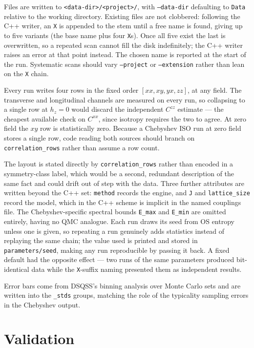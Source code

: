 \documentclass[11pt,a4paper]{article}
\newcommand{\code}[1]{\texttt{#1}}
\begin{document}
Files are written to \code{<data-dir>/<project>/}, with \code{--data-dir}
defaulting to \code{Data} relative to the working directory. Existing files are
not clobbered: following the C++ writer, an \code{X} is appended to the stem
until a free name is found, giving up to five variants (the base name plus four
\code{X}s). Once all five exist the last is overwritten, so a repeated scan
cannot fill the disk indefinitely; the C++ writer raises an error at that point
instead. The chosen name is reported at the start of the run. Systematic scans
should vary \code{--project} or \code{--extension} rather than lean on the
\code{X} chain.

Every run writes four rows in the fixed order $[xx,xy,yx,zz]$, at any field. The
transverse and longitudinal channels are measured on every run, so collapsing to
a single row at $h_z=0$ would discard the independent $C^{zz}$ estimate --- the
cheapest available check on $C^{xx}$, since isotropy requires the two to agree.
At zero field the $xy$ row is statistically zero. Because a Chebyshev ISO run at
zero field stores a single row, code reading both sources should branch on
\code{correlation\_rows} rather than assume a row count.

The layout is stated directly by \code{correlation\_rows} rather than encoded in
a symmetry-class label, which would be a second, redundant description of the
same fact and could drift out of step with the data. Three further attributes
are written beyond the C++ set: \code{method} records the engine, and \code{J}
and \code{lattice\_size} record the model, which in the C++ scheme is implicit
in the named couplings file. The Chebyshev-specific spectral bounds
\code{E\_max} and \code{E\_min} are omitted entirely, having no QMC analogue.
Each run draws its seed from OS entropy unless one is given, so repeating a run
genuinely adds statistics instead of replaying the same chain; the value used is
printed and stored in \code{parameters/seed}, making any run reproducible by
passing it back. A fixed default had the opposite effect --- two runs of the same
parameters produced bit-identical data while the \code{X}-suffix naming
presented them as independent results.

Error bars come from DSQSS's binning analysis over Monte Carlo sets and are
written into the \code{\_stds} groups, matching the role of the typicality
sampling errors in the Chebyshev output.

\section{Validation}
\label{sec:validation}
\end{document}
